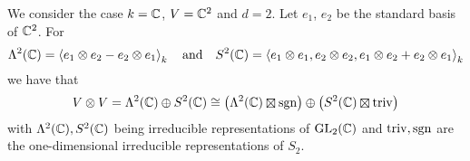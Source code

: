 \begin{example}
  We consider the case $k = \mathbb{C}$, $V = \mathbb{C}^2$ and $d = 2$.
  Let $e_1$, $e_2$ be the standard basis of $\mathbb{C}^2$.
  For
  \[
      \Lambda^2(\mathbb{C})
    = \left\langle  e_1 \otimes e_2 - e_2 \otimes e_1  \right\rangle_k
    \quad\text{and}\quad
      S^2(\mathbb{C})
    = \left\langle  e_1 \otimes e_1, e_2 \otimes e_2, e_1 \otimes e_2 + e_2 \otimes e_1  \right\rangle_k
  \]
  we have that
  \[
          V \otimes V
    =     \Lambda^2(\Complex) \oplus S^2(\Complex)
    \cong        \left( \Lambda^2(\Complex) \outertensor \sgn \right)
          \oplus \left( S^2(\Complex) \outertensor \triv \right)
  \]
  with $\Lambda^2(\mathbb{C}), S^2(\mathbb{C})$ being irreducible representations of $\operatorname{GL}_2(\mathbb{C})$ and $\operatorname{triv}, \operatorname{sgn}$ are the one-dimensional irreducible representations of $S_2$.
  
%     

\end{example}
